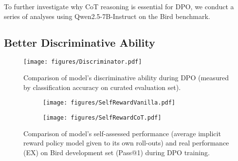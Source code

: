 To further investigate why CoT reasoning is essential for DPO, we conduct a series of analyses using Qwen2.5-7B-Instruct on the Bird benchmark. 

\subsection{Better Discriminative Ability}

\begin{figure*}[ht]
    \centering
    \begin{minipage}{0.31\linewidth} %
        \centering
    \texttt{[image: figures/Discriminator.pdf]}
  \caption{Comparison of model's discriminative ability during DPO (measured by classification accuracy on curated evaluation set). }
  \label{fig:discriminator}
    \end{minipage}
    \hfill %
    \begin{minipage}{0.62\linewidth} %
        \centering
          \begin{subfigure}[ht]{0.49\columnwidth}
            \centering
            \texttt{[image: figures/SelfRewardVanilla.pdf]}
            \label{fig:selfreward-a1}
          \end{subfigure}
          \hfill
          \begin{subfigure}[ht]{0.49\columnwidth}
            \centering
            \texttt{[image: figures/SelfRewardCoT.pdf]}
            \label{fig:selfreward-b}
          \end{subfigure}
          \caption{Comparison of model's self-assessed performance (average implicit reward policy model given to its own roll-outs) and real performance (EX) on Bird development set (Pass@1) during DPO training.}
          \label{fig:selfreward}
    \end{minipage}
\end{figure*}


